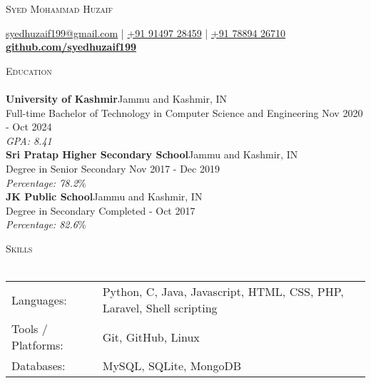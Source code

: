 \documentclass[a4paper]{article}
\newcommand{\lineunder} {
    \vspace*{-8pt} \\
    \hspace*{-18pt} \hrulefill \\
}
\newcommand{\header} [1] {
    {\hspace*{-18pt}\vspace*{6pt} \textsc{#1}}
    \vspace*{-6pt} \lineunder
}
\begin{document}
    \vspace*{-40pt}

    

%
%
  \vspace*{-2pt}
  \begin{center}
    {\Huge \scshape {Syed Mohammad Huzaif}}\\
    \vspace*{2pt}
    
    \vspace*{2pt}
    \href{mailto:syedhuzaif199@gmail.com}{syedhuzaif199@gmail.com} | \href{tel:+919149728459}{+91 91497 28459} | \href{tel:+917889426710}{+91 78894 26710}\\
    \vspace*{2pt}
    \textbf{\href{https://github.com/syedhuzaif199}{github.com/syedhuzaif199}}
  \end{center}



      \header{Education}
      \vspace{2mm}
      \textbf{University of Kashmir}\hfill Jammu and Kashmir, IN\\
Full-time Bachelor of Technology in Computer Science and Engineering \hfill Nov 2020 - Oct 2024\\
{\sl GPA: 8.41}\\
\vspace{2mm}
      \textbf{Sri Pratap Higher Secondary School}\hfill Jammu and Kashmir, IN\\
Degree in Senior Secondary \hfill Nov 2017 - Dec 2019\\
{\sl Percentage: 78.2}\%\\
\vspace{2mm}
      \textbf{JK Public School}\hfill Jammu and Kashmir, IN\\
Degree in Secondary \hfill Completed - Oct 2017\\
{\sl Percentage: 82.6}\%\\
\vspace{2mm}



%
%
  \header{Skills}
  \vspace{2mm}
  \begin{longtable}{p{4cm}p{12cm}}
  Languages: & Python, C, Java, Javascript, HTML, CSS, PHP, Laravel, Shell scripting \\
  Tools / Platforms: & Git, GitHub, Linux \\
  Databases: & MySQL, SQLite, MongoDB \\
  \end{longtable}
  \vspace{1mm}
\end{document}
